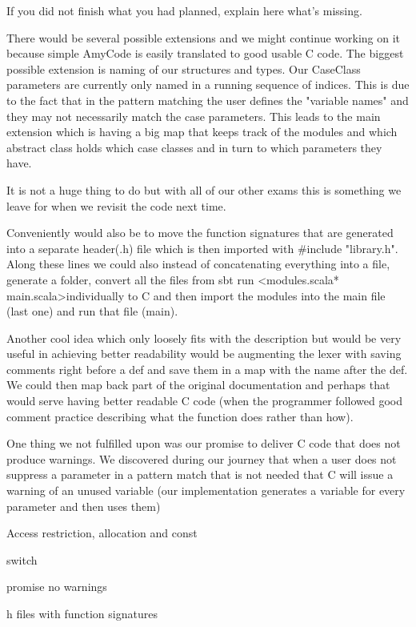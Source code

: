 If you did not finish what you had planned, explain here what's missing.


There would be several possible extensions and we might continue working on it because simple AmyCode is easily translated to good usable C code.
The biggest possible extension is naming of our structures and types. Our CaseClass parameters are currently only named in a running sequence of indices. This is due to the fact that in the pattern matching the user defines the "variable names" and they may not necessarily match the case parameters. This leads to the main extension which is having a big map that keeps track of the modules and which abstract class holds which case classes and in turn to which parameters they have.

It is not a huge thing to do but with all of our other exams this is something we leave for when we revisit the code next time.

Conveniently would also be to move the function signatures that are generated into a separate header(.h) file which is then imported with $\#$include "library.h".
Along these lines we could also instead of concatenating everything into a file, generate a folder, convert all the files from sbt run \textless modules.scala* main.scala\textgreater\space individually to C and then import the modules into the main file (last one) and run that file (main).

Another cool idea which only loosely fits with the description but would be very useful in achieving better readability would be augmenting the lexer with saving comments right before a def and save them in a map with the name after the def. We could then map back part of the original documentation and perhaps that would serve having better readable C code (when the programmer followed good comment practice describing what the function does rather than how).

One thing we not fulfilled upon was our promise to deliver C code that does not produce warnings. We discovered during our journey that when a user does not suppress a parameter in a pattern match that is not needed that C will issue a warning of an unused variable (our implementation generates a variable for every parameter and then uses them)

Access restriction, allocation and const

switch  

promise no warnings

h files with function signatures